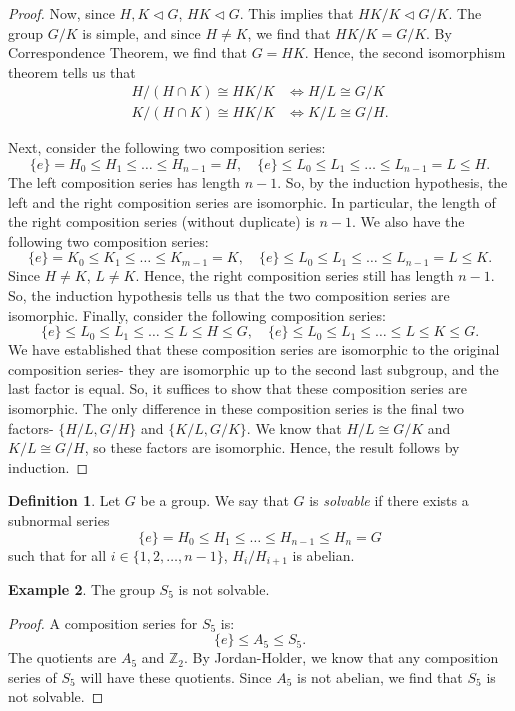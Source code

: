 \documentclass[a4paper, openany]{memoir}
\theoremstyle{definition}
\newtheorem{definition}{Definition}[section]
\newtheorem{example}[definition]{Example}
\theoremstyle{plain}
\begin{document}
\begin{proof}
        Now, since $H, K \vartriangleleft G$, $HK \vartriangleleft G$. This implies that $HK/K \vartriangleleft G/K$. The group $G/K$ is simple, and since $H \neq K$, we find that $HK/K = G/K$. By Correspondence Theorem, we find that $G = HK$. Hence, the second isomorphism theorem tells us that
        \begin{align*}
            H/(H \cap K) \cong HK/K &\iff H/L \cong G/K \\
            K/(H \cap K) \cong HK/K &\iff K/L \cong G/H.
        \end{align*}
        
        Next, consider the following two composition series:
        \[\{e\} = H_0 \leq H_1 \leq \dots \leq H_{n-1} = H, \quad \{e\} \leq L_0 \leq L_1 \leq \dots \leq L_{n-1} = L \leq H.\]
        The left composition series has length $n-1$. So, by the induction hypothesis, the left and the right composition series are isomorphic. In particular, the length of the right composition series (without duplicate) is $n-1$. We also have the following two composition series:
        \[\{e\} = K_0 \leq K_1 \leq \dots \leq K_{m-1} = K, \quad \{e\} \leq L_0 \leq L_1 \leq \dots \leq L_{n-1} = L \leq K.\]
        Since $H \neq K$, $L \neq K$. Hence, the right composition series still has length $n-1$. So, the induction hypothesis tells us that the two composition series are isomorphic. Finally, consider the following composition series:
        \[\{e\} \leq L_0 \leq L_1 \leq \dots \leq L \leq H \leq G, \quad \{e\} \leq L_0 \leq L_1 \leq \dots \leq L \leq K \leq G.\]
        We have established that these composition series are isomorphic to the original composition series- they are isomorphic up to the second last subgroup, and the last factor is equal. So, it suffices to show that these composition series are isomorphic. The only difference in these composition series is the final two factors- $\{H/L, G/H\}$ and $\{K/L, G/K\}$. We know that $H/L \cong G/K$ and $K/L \cong G/H$, so these factors are isomorphic. Hence, the result follows by induction.
    \end{proof}

    \begin{definition}
        Let $G$ be a group. We say that $G$ is \emph{solvable} if there exists a subnormal series
        \[\{e\} = H_0 \leq H_1 \leq \dots \leq H_{n-1} \leq H_n = G\]
        such that for all $i \in \{1, 2, \dots, n-1\}$, $H_i/H_{i+1}$ is abelian.
    \end{definition}

    \begin{example}
        The group $S_5$ is not solvable.
    \end{example}
    \begin{proof}
        A composition series for $S_5$ is:
        \[\{e\} \leq A_5 \leq S_5.\]
        The quotients are $A_5$ and $\mathbb{Z}_2$. By Jordan-Holder, we know that any composition series of $S_5$ will have these quotients. Since $A_5$ is not abelian, we find that $S_5$ is not solvable.
    \end{proof}
\end{document}
